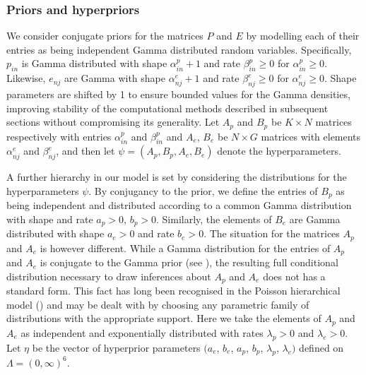 \documentclass{bioinfo}
\begin{document}
\subsubsection{Priors and hyperpriors} 
We consider conjugate priors for the matrices $P$ and $E$ by modelling
each of their entries as being independent Gamma distributed random
variables. Specifically, $p_{in}$ is Gamma distributed with shape
$\alpha_{in}^p + 1$ and rate $\beta_{in}^p \geq 0$ for
$\alpha_{in}^p \geq 0$. Likewise, $e_{nj}$ are Gamma with shape
$\alpha_{nj}^e+1$ and rate $\beta_{nj}^e \geq 0$ for
$\alpha_{nj}^e \geq 0$. Shape parameters are shifted by 1 to
ensure bounded values for the Gamma densities, improving stability of
the computational methods described in subsequent sections without
compromising its generality. Let $A_p$ and $B_p$ be $K\times N$
matrices respectively with entries $\alpha_{in}^p$ and $\beta_{in}^p$
and $A_e$, $B_e$ be $N\times G$ matrices with elements $\alpha_{nj}^e$
and $\beta_{nj}^e$, and then let $\psi = (A_p, B_p, A_e, B_e)$ denote
the hyperparameters.


A further hierarchy in our model is set by considering the
distributions for the hyperparameters $\psi$. By conjugancy to the
prior, we define the entries of $B_p$ as being independent and
distributed according to a common Gamma distribution with shape and
rate $a_p > 0$, $b_p > 0$. Similarly, the elements of $B_e$ are Gamma
distributed with shape $a_e>0$ and rate $b_e>0$. The situation for the
matrices $A_p$ and $A_e$ is however different. While a Gamma
distribution for the entries of $A_p$ and $A_e$ is conjugate to the
Gamma prior (see \citealp{M}), the resulting full conditional
distribution necessary to draw inferences about $A_p$ and
$A_e$ does not has a standard form.  This fact has long been
recognised in the Poisson hierarchical model (\citealp{GMS93}) and may
be dealt with by choosing any parametric family of distributions with
the appropriate support. Here we take the elements of $A_p$ and
$A_e$ as independent and exponentially distributed with rates
$\lambda_p > 0$ and $\lambda_e > 0$.  Let $\eta$ be the vector of
hyperprior parameters $(a_e$, $b_e$, $a_p$, $b_p$, $\lambda_p$,
$\lambda_e)$ defined on $\Lambda = (0, \infty)^6$.
\end{document}
